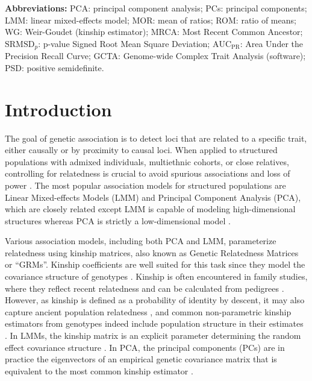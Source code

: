 \documentclass[11pt]{article}
\newcommand{\rmsd}{\text{SRMSD}_p}
\newcommand{\auc}{\text{AUC}_\text{PR}}
\begin{document}
\begin{linenumbers}
\textbf{Abbreviations:}
PCA: principal component analysis;
PCs: principal components;
LMM: linear mixed-effects model;
MOR: mean of ratios;
ROM: ratio of means;
WG: Weir-Goudet (kinship estimator);
MRCA: Most Recent Common Ancestor;
$\rmsd$: p-value Signed Root Mean Square Deviation;
$\auc$: Area Under the Precision Recall Curve;
GCTA: Genome-wide Complex Trait Analysis (software);
PSD: positive semidefinite.

\section{Introduction}

The goal of genetic association is to detect loci that are related to a specific trait, either causally or by proximity to causal loci.
When applied to structured populations with admixed individuals, multiethnic cohorts, or close relatives, controlling for relatedness is crucial to avoid spurious associations and loss of power \citep{devlin_genomic_1999, voight_confounding_2005, astle_population_2009, yao_limitations_2022}.
The most popular association models for structured populations are Linear Mixed-effects Models (LMM) and Principal Component Analysis (PCA), which are closely related except LMM is capable of modeling high-dimensional structures whereas PCA is strictly a low-dimensional model \citep{astle_population_2009, hoffman_correcting_2013, yao_limitations_2022}.

Various association models, including both PCA and LMM, parameterize relatedness using kinship matrices, also known as Genetic Relatedness Matrices or ``GRMs''.
Kinship coefficients are well suited for this task since they model the covariance structure of genotypes \citep{malecot_mathematiques_1948, jacquard_structures_1970}.
Kinship is often encountered in family studies, where they reflect recent relatedness and can be calculated from pedigrees \citep{wright_coefficients_1922, emik_systematic_1949, garcia-cortes_novel_2015}.
However, as kinship is defined as a probability of identity by descent, it may also capture ancient population relatedness \citep{malecot_mathematiques_1948, astle_population_2009}, and common non-parametric kinship estimators from genotypes indeed include population structure in their estimates \citep{ochoa_estimating_2021}.
In LMMs, the kinship matrix is an explicit parameter determining the random effect covariance structure \citep{xie_combining_1998,yu_unified_2006, aulchenko_genomewide_2007, astle_population_2009, kang_efficient_2008, kang_variance_2010, zhou_genome-wide_2012, yang_advantages_2014, loh_efficient_2015, sul_population_2018}.
In PCA, the principal components (PCs) are in practice the eigenvectors of an empirical genetic covariance matrix that is equivalent to the most common kinship estimator \citep{price_principal_2006, astle_population_2009, hoffman_correcting_2013, yao_limitations_2022}.


\end{linenumbers}
\end{document}
